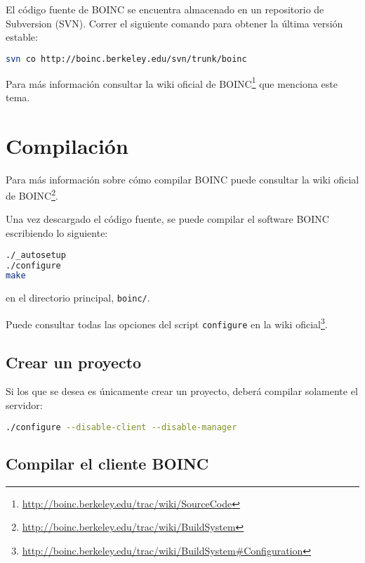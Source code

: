 \documentclass[12pt,spanish,a4paper]{report}
\begin{document}
El código fuente de BOINC se encuentra almacenado en un repositorio de Subversion (SVN). Correr el siguiente comando para obtener la última versión estable:

\begin{lstlisting}[frame=shadowbox, language=bash, basicstyle=\footnotesize, backgroundcolor=\color{gris}]
svn co http://boinc.berkeley.edu/svn/trunk/boinc
\end{lstlisting}

Para más información consultar la wiki oficial de BOINC\footnote{\url{http://boinc.berkeley.edu/trac/wiki/SourceCode}} que menciona este tema.


\section{Compilación}


Para más información sobre cómo compilar BOINC puede consultar la wiki oficial de BOINC\footnote{\url{http://boinc.berkeley.edu/trac/wiki/BuildSystem}}.

Una vez descargado el código fuente, se puede compilar el software BOINC escribiendo lo siguiente:

\begin{lstlisting}[frame=shadowbox, language=bash, basicstyle=\footnotesize, backgroundcolor=\color{gris}]
./_autosetup
./configure
make
\end{lstlisting}

en el directorio principal, \texttt{boinc/}.

Puede consultar todas las opciones del script \texttt{configure} en la wiki oficial\footnote{\url{http://boinc.berkeley.edu/trac/wiki/BuildSystem\#Configuration}}.


\subsection{Crear un proyecto}
\label{dependencias:crear:proyecto}
Si los que se desea es únicamente crear un proyecto, deberá compilar solamente el servidor:

\begin{lstlisting}[frame=shadowbox, language=bash, basicstyle=\footnotesize, backgroundcolor=\color{gris}]
./configure --disable-client --disable-manager
\end{lstlisting}

\subsection{Compilar el cliente BOINC}
\end{document}
